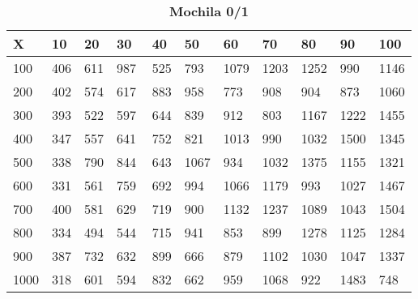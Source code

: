 \documentclass[10pt,letterpaper]{article}
\begin{document}
\newpage 
{}
\begin{center}
\begin{table}\renewcommand{\arraystretch}{2.5}
\caption{\large \textbf{Mochila 0/1}}
\centering
\begin{tabular} { |m{0.5cm}|m{1.3cm}|m{1.3cm}|m{1.3cm}|m{1.3cm}|m{1.3cm}|m{1.3cm}|m{1.3cm}|m{1.3cm}|m{1.3cm}|m{1.3cm}|} 
\hline
\rowcolor{Gray}
\centering \textbf{X} & \centering \textbf{10} & \centering \textbf{20} & \centering \textbf{30}\ & \centering \textbf{40} & \centering \textbf{50} & \centering \textbf{60}\ & \centering \textbf{70} & \centering \textbf{80} & \centering \textbf{90}\ & \textbf{100} \\\hline
\cellcolor{Gray}100 & \Large 406 & \Large 611 & \Large 987 & \Large 525 & \Large 793 & \Large 1079 & \Large 1203 & \Large 1252 & \Large 990 & \Large 1146 \\
\hline
\cellcolor{Gray}200 & \Large 402 & \Large 574 & \Large 617 & \Large 883 & \Large 958 & \Large 773 & \Large 908 & \Large 904 & \Large 873 & \Large 1060 \\
\hline
\cellcolor{Gray}300 & \Large 393 & \Large 522 & \Large 597 & \Large 644 & \Large 839 & \Large 912 & \Large 803 & \Large 1167 & \Large 1222 & \Large 1455 \\
\hline
\cellcolor{Gray}400 & \Large 347 & \Large 557 & \Large 641 & \Large 752 & \Large 821 & \Large 1013 & \Large 990 & \Large 1032 & \Large 1500 & \Large 1345 \\
\hline
\cellcolor{Gray}500 & \Large 338 & \Large 790 & \Large 844 & \Large 643 & \Large 1067 & \Large 934 & \Large 1032 & \Large 1375 & \Large 1155 & \Large 1321 \\
\hline
\cellcolor{Gray}600 & \Large 331 & \Large 561 & \Large 759 & \Large 692 & \Large 994 & \Large 1066 & \Large 1179 & \Large 993 & \Large 1027 & \Large 1467 \\
\hline
\cellcolor{Gray}700 & \Large 400 & \Large 581 & \Large 629 & \Large 719 & \Large 900 & \Large 1132 & \Large 1237 & \Large 1089 & \Large 1043 & \Large 1504 \\
\hline
\cellcolor{Gray}800 & \Large 334 & \Large 494 & \Large 544 & \Large 715 & \Large 941 & \Large 853 & \Large 899 & \Large 1278 & \Large 1125 & \Large 1284 \\
\hline
\cellcolor{Gray}900 & \Large 387 & \Large 732 & \Large 632 & \Large 899 & \Large 666 & \Large 879 & \Large 1102 & \Large 1030 & \Large 1047 & \Large 1337 \\
\hline
\cellcolor{Gray}1000 & \Large 318 & \Large 601 & \Large 594 & \Large 832 & \Large 662 & \Large 959 & \Large 1068 & \Large 922 & \Large 1483 & \Large 748 \\
\hline
\end{tabular} \\
\end{table}
\end{center}
\end{document}
